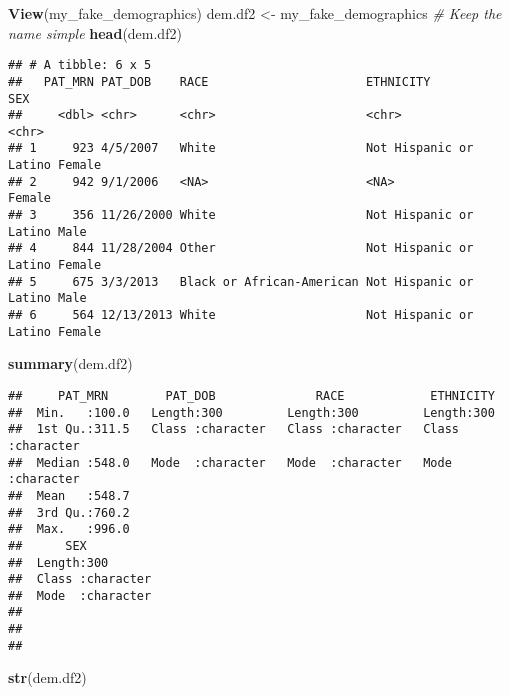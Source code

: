 \documentclass[
]{article}
\newenvironment{Shaded}{\begin{snugshade}}{\end{snugshade}}
\newcommand{\CommentTok}[1]{\textcolor[rgb]{0.56,0.35,0.01}{\textit{#1}}}
\newcommand{\FunctionTok}[1]{\textcolor[rgb]{0.13,0.29,0.53}{\textbf{#1}}}
\newcommand{\NormalTok}[1]{#1}
\newcommand{\OtherTok}[1]{\textcolor[rgb]{0.56,0.35,0.01}{#1}}
\begin{document}
\begin{Shaded}
\begin{Highlighting}[]
\FunctionTok{View}\NormalTok{(my\_fake\_demographics)}
\NormalTok{dem.df2 }\OtherTok{\textless{}{-}}\NormalTok{ my\_fake\_demographics }\CommentTok{\# Keep the name simple }
\FunctionTok{head}\NormalTok{(dem.df2)}
\end{Highlighting}
\end{Shaded}

\begin{verbatim}
## # A tibble: 6 x 5
##   PAT_MRN PAT_DOB    RACE                      ETHNICITY              SEX   
##     <dbl> <chr>      <chr>                     <chr>                  <chr> 
## 1     923 4/5/2007   White                     Not Hispanic or Latino Female
## 2     942 9/1/2006   <NA>                      <NA>                   Female
## 3     356 11/26/2000 White                     Not Hispanic or Latino Male  
## 4     844 11/28/2004 Other                     Not Hispanic or Latino Female
## 5     675 3/3/2013   Black or African-American Not Hispanic or Latino Male  
## 6     564 12/13/2013 White                     Not Hispanic or Latino Female
\end{verbatim}

\begin{Shaded}
\begin{Highlighting}[]
\FunctionTok{summary}\NormalTok{(dem.df2)}
\end{Highlighting}
\end{Shaded}

\begin{verbatim}
##     PAT_MRN        PAT_DOB              RACE            ETHNICITY        
##  Min.   :100.0   Length:300         Length:300         Length:300        
##  1st Qu.:311.5   Class :character   Class :character   Class :character  
##  Median :548.0   Mode  :character   Mode  :character   Mode  :character  
##  Mean   :548.7                                                           
##  3rd Qu.:760.2                                                           
##  Max.   :996.0                                                           
##      SEX           
##  Length:300        
##  Class :character  
##  Mode  :character  
##                    
##                    
## 
\end{verbatim}

\begin{Shaded}
\begin{Highlighting}[]
\FunctionTok{str}\NormalTok{(dem.df2)}
\end{Highlighting}
\end{Shaded}
\end{document}
